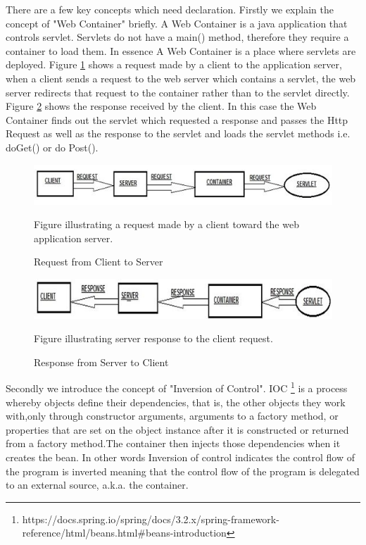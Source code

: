 There are a few key concepts which need declaration.
Firstly we explain the concept of "Web Container" briefly. A Web Container is a java application that controls servlet. 
Servlets do not have a main() method, therefore they require a container to load them. In essence A Web Container is a place where servlets are deployed. Figure \ref{fig:request_pic} shows a request made by a client to the application server, when a client sends a request to the web server which contains a servlet, the web server redirects that request to the container rather than to the servlet directly. Figure \ref{fig:respond_pic} shows the response received by the client. In this case the Web Container finds out the servlet which requested a response and passes the Http Request as well as the response to the servlet and loads the servlet methods i.e. doGet() or do Post(). 
\begin{figure} 
\centering
\includegraphics[width=14cm]{pictures/request_pic.jpeg}
\caption{Request from Client to Server}
Figure illustrating a request made by a client toward the web application server. 
\label{fig:request_pic}
\end{figure}
\begin{figure} 
\centering
\includegraphics[width=14cm]{pictures/response_pic.jpeg}
\caption{Response from Server to Client}
Figure illustrating server response to the client request.
\label{fig:respond_pic}
\end{figure}

Secondly we introduce the concept of "Inversion of Control".
IOC \footnote{https://docs.spring.io/spring/docs/3.2.x/spring-framework-reference/html/beans.html\#beans-introduction} is a process whereby objects define their dependencies, that is, the other objects they work with,only through constructor arguments, arguments to a factory method, or properties that are set on the object instance after it is constructed or returned from a factory method.The container then injects those dependencies when it creates the bean.
In other words Inversion of control indicates the control flow of the program is inverted meaning that the control flow of the program is delegated to an external source, a.k.a. the container.

